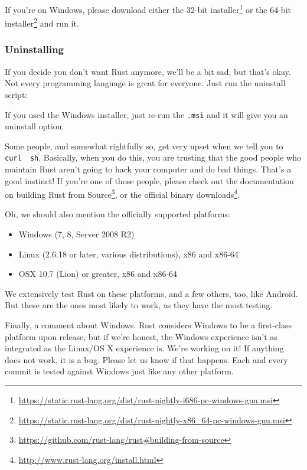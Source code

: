 \documentclass[a4paper,]{book}
\newenvironment{Shaded}{\begin{snugshade}}{\end{snugshade}}
\newcommand{\KeywordTok}[1]{\textcolor[rgb]{0.13,0.29,0.53}{\textbf{{#1}}}}
\newcommand{\NormalTok}[1]{{#1}}
\renewcommand{\href}[2]{#2\footnote{\url{#1}}}
\providecommand{\tightlist}{%
  \setlength{\itemsep}{0pt}\setlength{\parskip}{0pt}}
\begin{document}
If you're on Windows, please download either the
\href{https://static.rust-lang.org/dist/rust-nightly-i686-pc-windows-gnu.msi}{32-bit
installer} or the
\href{https://static.rust-lang.org/dist/rust-nightly-x86_64-pc-windows-gnu.msi}{64-bit
installer} and run it.

\subsubsection{Uninstalling}\label{uninstalling-1}

If you decide you don't want Rust anymore, we'll be a bit sad, but
that's okay. Not every programming language is great for everyone. Just
run the uninstall script:

\begin{Shaded}
\end{Shaded}

If you used the Windows installer, just re-run the \texttt{.msi} and it
will give you an uninstall option.

Some people, and somewhat rightfully so, get very upset when we tell you
to \texttt{curl\ \textbar{}\ sh}. Basically, when you do this, you are
trusting that the good people who maintain Rust aren't going to hack
your computer and do bad things. That's a good instinct! If you're one
of those people, please check out the documentation on
\href{https://github.com/rust-lang/rust\#building-from-source}{building
Rust from Source}, or \href{http://www.rust-lang.org/install.html}{the
official binary downloads}.

Oh, we should also mention the officially supported platforms:

\begin{itemize}
\tightlist
\item
  Windows (7, 8, Server 2008 R2)
\item
  Linux (2.6.18 or later, various distributions), x86 and x86-64
\item
  OSX 10.7 (Lion) or greater, x86 and x86-64
\end{itemize}

We extensively test Rust on these platforms, and a few others, too, like
Android. But these are the ones most likely to work, as they have the
most testing.

Finally, a comment about Windows. Rust considers Windows to be a
first-class platform upon release, but if we're honest, the Windows
experience isn't as integrated as the Linux/OS X experience is. We're
working on it! If anything does not work, it is a bug. Please let us
know if that happens. Each and every commit is tested against Windows
just like any other platform.
\end{document}
